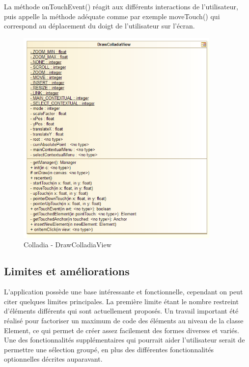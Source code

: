 La méthode onTouchEvent() réagit aux différents interactions de l'utilisateur, puis appelle la méthode adéquate comme par exemple moveTouch() qui correspond au déplacement du doigt de l'utilisateur sur l'écran.  
	\begin{figure}[!h]
		\centering
		\includegraphics[width=10cm]{img/UmlDrawView}
		\caption{Colladia - DrawColladiaView}
	\end{figure}

\subsection{Limites et améliorations}
L'application possède une base intéressante et fonctionnelle, cependant on peut citer quelques limites principales.
La première limite étant le nombre restreint d'éléments différents qui sont actuellement proposés. Un travail important été réalisé pour factoriser un maximum de code des éléments au niveau de la classe Element, ce qui permet de créer assez facilement des formes diverses et variés.
Une des fonctionnalités supplémentaires qui pourrait aider l'utilisateur serait de permettre une sélection groupé, en plus des différentes fonctionnalités optionnelles décrites auparavant.

